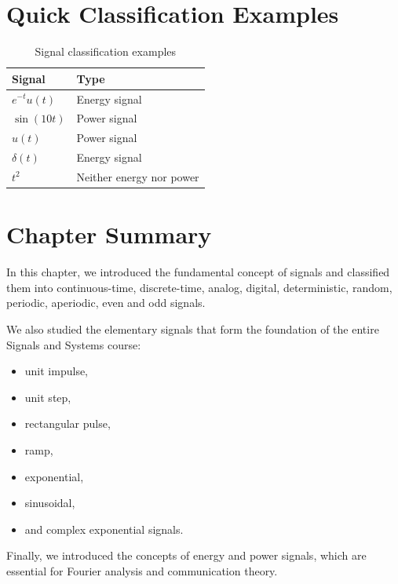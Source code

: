 \section{Quick Classification Examples}

\begin{table}[H]
\centering
\caption{Signal classification examples}
\begin{tabular}{|p{5cm}|p{6cm}|}
\hline
\textbf{Signal} & \textbf{Type} \\
\hline
\(e^{-t}u(t)\) & Energy signal \\
\hline
\(\sin(10t)\) & Power signal \\
\hline
\(u(t)\) & Power signal \\
\hline
\(\delta(t)\) & Energy signal \\
\hline
\(t^2\) & Neither energy nor power \\
\hline
\end{tabular}
\end{table}


\section{Chapter Summary}

In this chapter, we introduced the fundamental concept of signals and classified
them into continuous-time, discrete-time, analog, digital, deterministic,
random, periodic, aperiodic, even and odd signals.

We also studied the elementary signals that form the foundation of the entire
Signals and Systems course:

\begin{itemize}
\item unit impulse,
\item unit step,
\item rectangular pulse,
\item ramp,
\item exponential,
\item sinusoidal,
\item and complex exponential signals.
\end{itemize}

Finally, we introduced the concepts of energy and power signals, which are
essential for Fourier analysis and communication theory.


